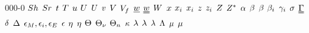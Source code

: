 \begin{mitframe}{000-0}
$\sherwood$ \newline
$\strouhal$ \newline
$\timet$ \newline
$\Temp$ \newline
$\forcepot$ \newline
$\intenergy$ \newline
$\uvel$ \newline
$\vvel$ \newline
$\vol$ \newline
$\freevol$ \newline
$\vort$ \newline
$\vorttens$ \newline
$\work$ \newline
$\disp$ \newline
$\conjcoor$ \newline
$\specfrac{i}$ \newline
$\heightz$ \newline                              
$\charges$ \newline
$\compress$ \newline
$\configint$ \newline
$\tdiff$ \newline
$\boltznorm$ \newline
$\texpcoeff$ \newline
$\sexcoeff$ \newline
$\actcoeff$ \newline
$\surftens$ \newline
$\straintens$ \newline
$\blthick$ \newline
$\iipf$ \newline
$\eddydiff$ \newline
$\dielec$ \newline
$\heateffic$ \newline
$\intrinsvisc$ \newline
$\dimltemp$ \newline
$\vibrfreqfac$ \newline
$\fftcoeff$ \newline
$\comeback$ \newline
$\wavel$ \newline
$\latheat$ \newline
$\debye$ \newline
$\debroglie$ \newline
$\chempot$ \newline
$\visc$ \newline

\end{mitframe}
